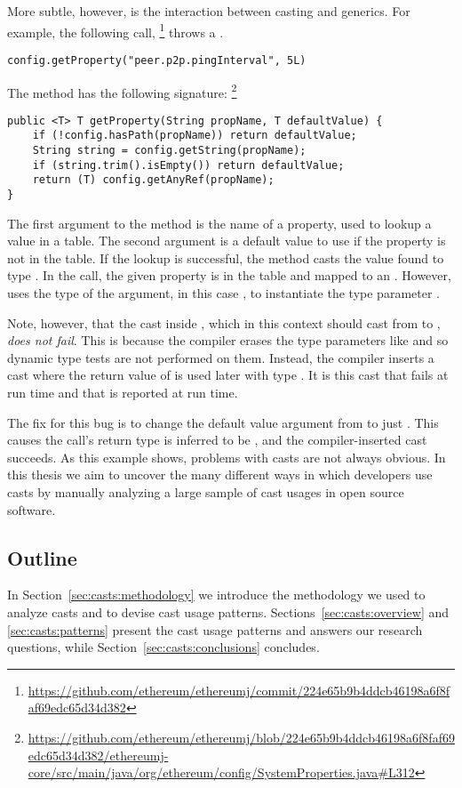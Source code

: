 More subtle, however, is the interaction between casting and generics.
For example, the following call,%
\footnote{\url{https://github.com/ethereum/ethereumj/commit/224e65b9b4ddcb46198a6f8faf69edc65d34d382}}
throws a .

\begin{verbatim}
config.getProperty("peer.p2p.pingInterval", 5L)
\end{verbatim}

The method has the following signature:%
\footnote{\url{https://github.com/ethereum/ethereumj/blob/224e65b9b4ddcb46198a6f8faf69edc65d34d382/ethereumj-core/src/main/java/org/ethereum/config/SystemProperties.java\#L312}}
\begin{verbatim}
public <T> T getProperty(String propName, T defaultValue) {
    if (!config.hasPath(propName)) return defaultValue;
    String string = config.getString(propName);
    if (string.trim().isEmpty()) return defaultValue;
    return (T) config.getAnyRef(propName);
}
\end{verbatim}
The first argument to the method is the name of a property, used to lookup a
value in a table. The second argument is a default value to use if the
property is not in the table. If the lookup is successful, the method casts
the value found to type .
In the call, the given property
 is in the table and mapped to an .
However, \java{} uses the type of the  argument, in this
case , to instantiate the type parameter .

Note, however, that the cast inside , which in this context
should cast from  to , \emph{does not fail}.
This is because the \java{} compiler erases the type
parameters like  and so dynamic type tests are not performed on them.
Instead, the compiler inserts a cast where the return value
of  is used later with type .
It is this cast that fails at run time and that is reported at run time.

The fix for this bug is to change the default value argument from 
to just . This causes the call's return type is inferred to be
, and the compiler-inserted cast succeeds.
As this example shows, problems with casts are not always obvious.
In this thesis we aim to uncover the many different ways in which developers use casts
by manually analyzing a large sample of cast usages in open source software.

\subsection*{Outline}

In Section~\ref{sec:casts:methodology} we introduce the methodology we used to analyze casts and to devise cast usage patterns.
Sections~\ref{sec:casts:overview} and \ref{sec:casts:patterns} present the cast usage patterns and answers our research questions,
while Section~\ref{sec:casts:conclusions} concludes.




